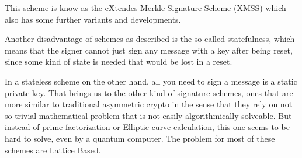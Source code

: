 \documentclass[conference]{IEEEtran}
\begin{document}
This scheme is know as the eXtendes Merkle Signature Scheme (XMSS) which also has some further variants and developments. \cite{QR_IoT }

Another disadvantage of schemes as described is the so-called statefulness, which means that the signer cannot just sign any message with a key after being reset, since some kind of state is needed that would be lost in a reset. \cite{QR_sigs}

In a stateless scheme on the other hand, all you need to sign a message is a static private key.
That brings us to the other kind of signature schemes, ones that are more similar to traditional asymmetric crypto in the sense that they rely on not so trivial mathematical problem that is not easily algorithmically solveable. But instead of prime factorization or Elliptic curve calculation, this one seems to be hard to solve, even by a quantum computer. The problem for most of these schemes are Lattice Based.
\end{document}
